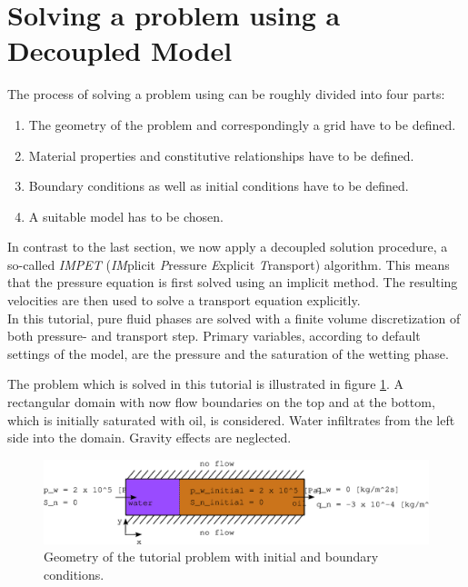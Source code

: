 \section[Decoupled model]{Solving a problem using a Decoupled Model}\label{tutorial-decoupled}
The process of solving a problem using \Dumux can be roughly divided into four parts: 
\begin{enumerate}
 \item The geometry of the problem and correspondingly a grid have to be defined.
 \item Material properties and constitutive relationships have to be defined.
 \item Boundary conditions as well as initial conditions have to be defined.
 \item A suitable model has to be chosen.
\end{enumerate}

In contrast to the last section, we now apply a decoupled solution procedure, a
so-called \textit{IMPET} (\textit{IM}plicit \textit{P}ressure \textit{E}xplicit 
\textit{T}ransport) algorithm. This means that the pressure equation is first 
solved using an implicit method. The resulting velocities are then used to solve
a transport equation explicitly.\\
In this tutorial, pure fluid phases are solved with a finite volume discretization
of both pressure- and transport step. Primary variables, according to default
settings of the model, are the pressure and the saturation of the wetting phase.

The problem which is solved in this tutorial is illustrated in figure 
\ref{tutorial-decoupled:problemfigure}. A rectangular domain with now flow 
boundaries on the top and at the bottom, which is initially saturated with oil, 
is considered. Water infiltrates from the left side into the domain. Gravity 
effects are neglected.

\begin{figure}[h]
\centering
\includegraphics[width=0.9\linewidth,keepaspectratio]{EPS/tutorial-problemconfiguration}
\caption{Geometry of the tutorial problem with initial and boundary conditions.}\label{tutorial-decoupled:problemfigure}
\end{figure}

